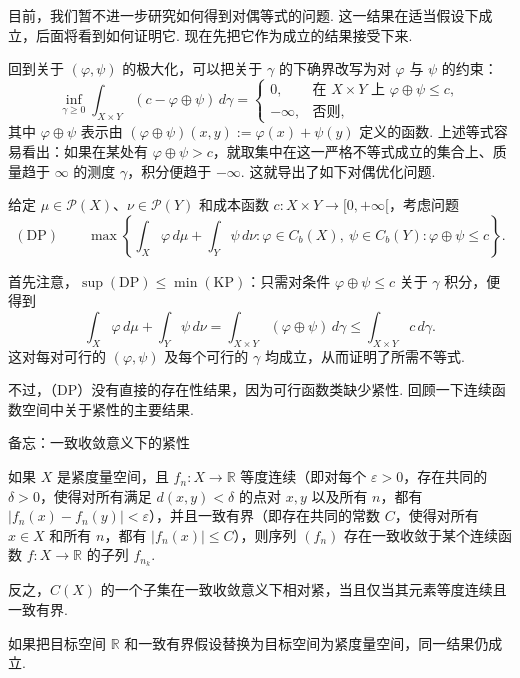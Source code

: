 目前，我们暂不进一步研究如何得到对偶等式的问题. 这一结果在适当假设下成立，后面将看到如何证明它. 现在先把它作为成立的结果接受下来.

回到关于 $(\varphi,\psi)$ 的极大化，可以把关于 $\gamma$ 的下确界改写为对 $\varphi$ 与 $\psi$ 的约束：
\[
\inf_{\gamma\ge0}\int_{X\times Y}(c-\varphi\oplus\psi)\,d\gamma
=\begin{cases}
0,&\text{在 }X\times Y\text{ 上 }\varphi\oplus\psi\le c,\\
-\infty,&\text{否则},
\end{cases}
\]
其中 $\varphi\oplus\psi$ 表示由 $(\varphi\oplus\psi)(x,y):=\varphi(x)+\psi(y)$ 定义的函数. 上述等式容易看出：如果在某处有 $\varphi\oplus\psi>c$，就取集中在这一严格不等式成立的集合上、质量趋于 $\infty$ 的测度 $\gamma$，积分便趋于 $-\infty$. 这就导出了如下对偶优化问题.

\begin{problem}\label{obj:1.9}
给定 $\mu\in\mathscr P(X)$、$\nu\in\mathscr P(Y)$ 和成本函数 $c:X\times Y\to[0,+\infty[$，考虑问题
\begin{equation}\label{eq:1.4}
(\mathrm{DP})\qquad
\max\left\{\int_X\varphi\,d\mu+\int_Y\psi\,d\nu:
\varphi\in C_b(X),\ \psi\in C_b(Y):\varphi\oplus\psi\le c\right\}.
\end{equation}
\end{problem}

首先注意，$\sup(\mathrm{DP})\le\min(\mathrm{KP})$：只需对条件 $\varphi\oplus\psi\le c$ 关于 $\gamma$ 积分，便得到
\[
\int_X\varphi\,d\mu+\int_Y\psi\,d\nu
=\int_{X\times Y}(\varphi\oplus\psi)\,d\gamma
\le\int_{X\times Y}c\,d\gamma.
\]
这对每对可行的 $(\varphi,\psi)$ 及每个可行的 $\gamma$ 均成立，从而证明了所需不等式.

不过，（DP）没有直接的存在性结果，因为可行函数类缺少紧性. 回顾一下连续函数空间中关于紧性的主要结果.

\begin{sourcebox}{备忘：一致收敛意义下的紧性}\label{box:1.7}
\begin{theorem*}
如果 $X$ 是紧度量空间，且 $f_n:X\to\mathbb R$ 等度连续（即对每个 $\varepsilon>0$，存在共同的 $\delta>0$，使得对所有满足 $d(x,y)<\delta$ 的点对 $x,y$ 以及所有 $n$，都有 $|f_n(x)-f_n(y)|<\varepsilon$），并且一致有界（即存在共同的常数 $C$，使得对所有 $x\in X$ 和所有 $n$，都有 $|f_n(x)|\le C$），则序列 $(f_n)$ 存在一致收敛于某个连续函数 $f:X\to\mathbb R$ 的子列 $f_{n_k}$.

反之，$C(X)$ 的一个子集在一致收敛意义下相对紧，当且仅当其元素等度连续且一致有界.

如果把目标空间 $\mathbb R$ 和一致有界假设替换为目标空间为紧度量空间，同一结果仍成立.
\end{theorem*}
\end{sourcebox}

